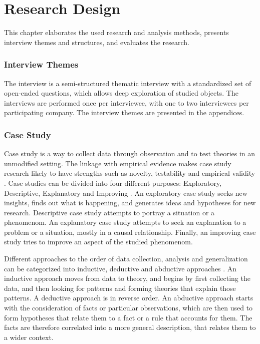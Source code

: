 \chapter{Research Design}
\label{chapter:Research Design} 

This chapter elaborates the used research and analysis methods, presents interview themes and structures, and evaluates the research. 

\subsection{Interview Themes}
The interview is a semi-structured thematic interview with a standardized set of open-ended questions, which allows deep exploration of studied objects. The interviews are performed once per interviewee, with one to two interviewees per participating company. The interview themes are presented in the appendices.

\subsection{Case Study}
Case study is a way to collect data through observation and to test theories in an unmodified setting. The linkage with empirical evidence makes case study research likely to have strengths such as novelty, testability and empirical validity \cite{eisenhardt1989building}. Case studies can be divided into four different purposes: Exploratory, Descriptive, Explanatory and Improving \cite{robson2016real}. An exploratory case study seeks new insights, finds out what is happening, and generates ideas and hypotheses for new research. Descriptive case study attempts to portray a situation or a phenomenom. An explanatory case study attempts to seek an explanation to a problem or a situation, mostly in a causal relationship. Finally, an improving case study tries to improve an aspect of the studied phenomenom.

Different approaches to the order of data collection, analysis and generalization can be categorized into inductive, deductive and abductive approaches \cite{dubois2002systematic}. An inductive approach moves from data to theory, and begins by first collecting the data, and then looking for patterns and forming theories that explain those patterns. A deductive approach is in reverse order. An abductive approach starts with the consideration of facts or particular observations, which are then used to form hypotheses that relate them to a fact or a rule that accounts for them. The facts are therefore correlated into a more general description, that relates them to a wider context.

